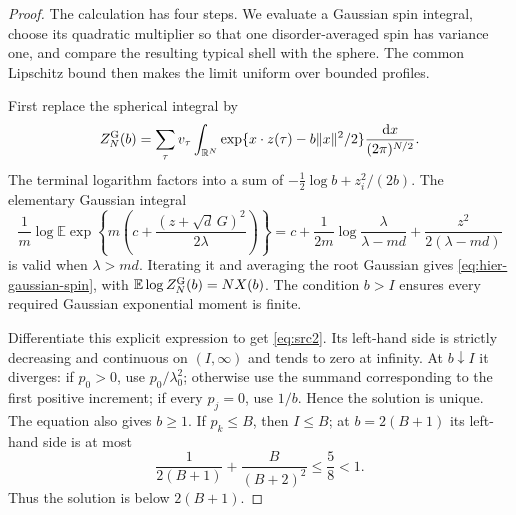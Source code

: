 \documentclass[11pt,a4paper]{article}
\numberwithin{equation}{section}
\theoremstyle{definition}
\theoremstyle{remark}
\newcommand{\E}{\mathbb E}
\newcommand{\R}{\mathbb R}
\newcommand{\dd}{\mathrm d}
\begin{document}
\begin{proof}
The calculation has four steps.  We evaluate a Gaussian spin integral,
choose its quadratic multiplier so that one disorder-averaged spin has
variance one, and compare the resulting typical shell with the sphere.
The common Lipschitz bound then makes the limit uniform over bounded
profiles.

First replace the spherical integral by
\[
 Z_N^{\rm G}(b)=\sum_\tau v_\tau
 \int_{\R^N}\exp\{x\cdot z(\tau)-b\|x\|^2/2\}
                     \frac{\dd x}{(2\pi)^{N/2}}.
\]
The terminal logarithm factors into a sum of
$-\frac12\log b+z_i^2/(2b)$.  The elementary Gaussian integral
\[
 \frac1m\log\E\exp\!\left\{
 m\left(c+\frac{(z+\sqrt d\,G)^2}{2\lambda}\right)\right\}
 =c+\frac1{2m}\log\frac\lambda{\lambda-md}
       +\frac{z^2}{2(\lambda-md)}
\]
is valid when $\lambda>md$.  Iterating it and averaging the root Gaussian
gives \eqref{eq:hier-gaussian-spin}, with
$\E\log Z_N^{\rm G}(b)=NX(b)$.  The condition $b>I$ ensures every required
Gaussian exponential moment is finite.

Differentiate this explicit expression to get \eqref{eq:src2}.  Its
left-hand side is strictly decreasing and continuous on $(I,\infty)$ and
tends to zero at infinity.  At $b\downarrow I$ it diverges: if $p_0>0$, use
$p_0/\lambda_0^2$; otherwise use the summand corresponding to the first
positive increment; if every $p_j=0$, use $1/b$.  Hence the solution is
unique.  The equation also gives $b\ge1$.  If $p_k\le B$, then $I\le B$;
at $b=2(B+1)$ its left-hand side is at most
\[
 \frac1{2(B+1)}+\frac{B}{(B+2)^2}\le\frac58<1.
\]
Thus the solution is below $2(B+1)$.


\end{proof}
\end{document}
